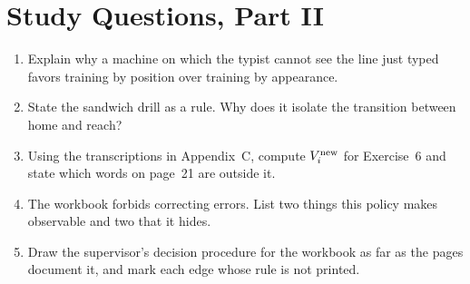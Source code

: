\chapter*{Study Questions, Part II}
\begin{enumerate}
\item Explain why a machine on which the typist cannot see the line just typed favors training by position over training by appearance.
\item State the sandwich drill as a rule. Why does it isolate the transition between home and reach?
\item Using the transcriptions in Appendix~C, compute $V_i^{\mathrm{new}}$ for Exercise~6 and state which words on page~21 are outside it.
\item The workbook forbids correcting errors. List two things this policy makes observable and two that it hides.
\item Draw the supervisor's decision procedure for the workbook as far as the pages document it, and mark each edge whose rule is not printed.
\end{enumerate}
